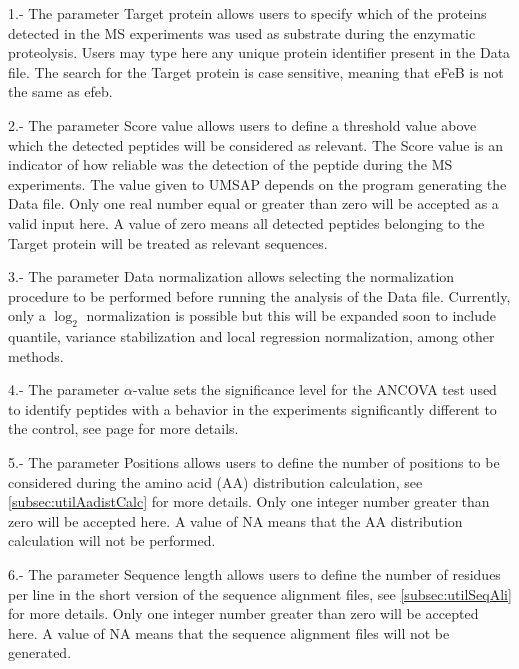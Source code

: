 \num{1}.- The parameter Target protein\label{par:tarprotTargetProt} allows users to specify which of the proteins detected in the MS experiments was used as substrate during the enzymatic proteolysis. Users may type here any unique protein identifier present in the Data file. The search for the Target protein is case sensitive, meaning that eFeB is not the same as efeb.

\num{2}.- The parameter Score value\label{par:tarprotScoreValue} allows users to define a threshold value above which the detected peptides will be considered as relevant. The Score value is an indicator of how reliable was the detection of the peptide during the MS experiments. The value given to UMSAP depends on the program generating the Data file. Only one real number equal or greater than zero will be accepted as a valid input here. A value of zero means all detected peptides belonging to the Target protein will be treated as relevant sequences.

\num{3}.- The parameter Data normalization allows selecting the normalization procedure to be performed before running the analysis of the Data file. Currently, only a $\log_2$ normalization is possible but this will be expanded soon to include quantile, variance stabilization and local regression normalization, among other methods. 

\num{4}.- The parameter $\alpha$-value sets the significance level for the ANCOVA test used to identify peptides with a behavior in the experiments significantly different to the control, see page \pageref{par:tarprotAncovaTest} for more details.

\num{5}.- The parameter Positions\label{par:tarprotPos} allows users to define the number of positions to be considered during the amino acid (AA) distribution calculation, see \autoref{subsec:utilAadistCalc} for more details. Only one integer number greater than zero will be accepted here. A value of NA means that the AA distribution calculation will not be performed. 

\num{6}.- The parameter Sequence length\label{par:tarprotSeqL} allows users to define the number of residues per line in the short version of the sequence alignment files, see \autoref{subsec:utilSeqAli} for more details. Only one integer number greater than zero will be accepted here. A value of NA means that the sequence alignment files will not be generated.

